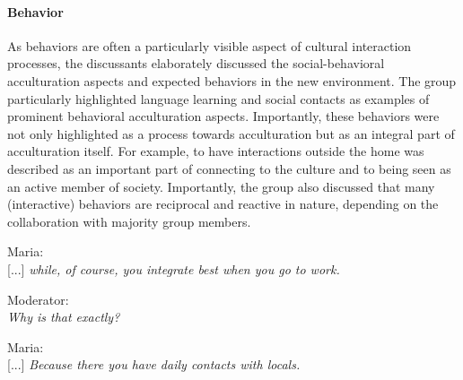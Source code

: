 \documentclass[nobib]{tufte-handout}
\begin{document}
\paragraph{Behavior} As behaviors are often a particularly visible aspect of cultural interaction processes, the discussants elaborately discussed the social-behavioral acculturation aspects and expected behaviors in the new environment. The group particularly highlighted language learning and social contacts as examples of prominent behavioral acculturation aspects. Importantly, these behaviors were not only highlighted as a process towards acculturation but as an integral part of acculturation itself. For example, to have interactions outside the home was described as an important part of connecting to the culture and to being seen as an active member of society. Importantly, the group also discussed that many (interactive) behaviors are reciprocal and reactive in nature, depending on the collaboration with majority group members.
\begin{displayquote}
    Maria:\\
    {[...]} \textit{while, of course, you integrate best when you go to work.}
    
    Moderator:\\
    \textit{Why is that exactly?}
    
    Maria:\\
    {[...]} \textit{Because there you have daily contacts with locals.}
\end{displayquote}
\end{document}
